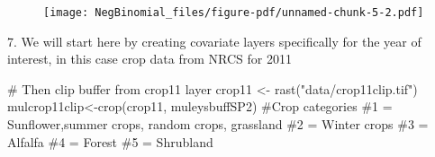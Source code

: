 \documentclass[
  letterpaper,
]{book}
\newenvironment{Shaded}{\begin{snugshade}}{\end{snugshade}}
\newcommand{\CommentTok}[1]{\textcolor[rgb]{0.37,0.37,0.37}{#1}}
\newcommand{\FunctionTok}[1]{\textcolor[rgb]{0.28,0.35,0.67}{#1}}
\newcommand{\NormalTok}[1]{\textcolor[rgb]{0.00,0.23,0.31}{#1}}
\newcommand{\OtherTok}[1]{\textcolor[rgb]{0.00,0.23,0.31}{#1}}
\newcommand{\StringTok}[1]{\textcolor[rgb]{0.13,0.47,0.30}{#1}}
\begin{document}
\begin{figure}[H]

{\centering \texttt{[image: NegBinomial\_files/figure-pdf/unnamed-chunk-5-2.pdf]}

}

\end{figure}

7. We will start here by creating covariate layers specifically for the
year of interest, in this case crop data from NRCS for 2011

\begin{Shaded}
\begin{Highlighting}[]
\CommentTok{\# Then clip buffer from crop11 layer}
\NormalTok{crop11 }\OtherTok{\textless{}{-}} \FunctionTok{rast}\NormalTok{(}\StringTok{"data/crop11clip.tif"}\NormalTok{)}
\NormalTok{mulcrop11clip}\OtherTok{\textless{}{-}}\FunctionTok{crop}\NormalTok{(crop11, muleysbuffSP2)}
\CommentTok{\#Crop categories}
\CommentTok{\#1 = Sunflower,summer crops, random crops, grassland}
\CommentTok{\#2 = Winter crops}
\CommentTok{\#3 = Alfalfa}
\CommentTok{\#4 = Forest}
\CommentTok{\#5 = Shrubland}


\end{Highlighting}
\end{Shaded}
\end{document}
